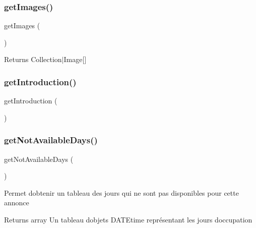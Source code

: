 \subsubsection{\texorpdfstring{getImages()}{getImages()}}
{\footnotesize\ttfamily get\+Images (\begin{DoxyParamCaption}{ }\end{DoxyParamCaption})}

\begin{DoxyReturn}{Returns}
Collection$\vert$\+Image\mbox{[}\mbox{]} 
\end{DoxyReturn}
\mbox{\label{class_app_1_1_entity_1_1_ad_a35d5a57a94ec7eac2f80749ad8e256bd}} 
\subsubsection{\texorpdfstring{getIntroduction()}{getIntroduction()}}
{\footnotesize\ttfamily get\+Introduction (\begin{DoxyParamCaption}{ }\end{DoxyParamCaption})}

\mbox{\label{class_app_1_1_entity_1_1_ad_abad30aac01e3b8a49980acac5d05f05c}} 
\subsubsection{\texorpdfstring{getNotAvailableDays()}{getNotAvailableDays()}}
{\footnotesize\ttfamily get\+Not\+Available\+Days (\begin{DoxyParamCaption}{ }\end{DoxyParamCaption})}

Permet d\textquotesingle{}obtenir un tableau des jours qui ne sont pas disponibles pour cette annonce

\begin{DoxyReturn}{Returns}
array Un tableau d\textquotesingle{}objets D\+A\+T\+Etime représentant les jours d\textquotesingle{}occupation 
\end{DoxyReturn}
\mbox{\label{class_app_1_1_entity_1_1_ad_a38146d2beb1dd6dfd0f2a5886e18a538}} 
